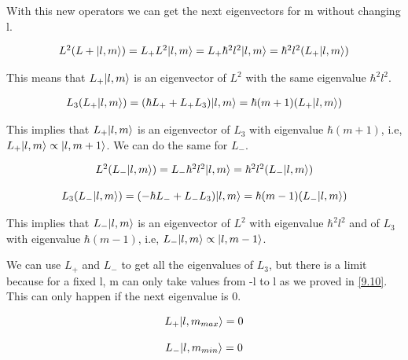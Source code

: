 With this new operators we can get the next eigenvectors for m without changing l.

\begin{equation}
  \begin{array}{c}
    L^2 (L+\lvert l,m\rangle) = L_+ L^2 \lvert l,m\rangle = L_+ \hbar^2 l^2 \lvert l,m\rangle = \hbar^2 l^2 (L_+ \lvert l,m\rangle)
  \end{array}
\end{equation}

This means that $L_+\lvert l,m\rangle$ is an eigenvector of $L^2$ with the same eigenvalue $\hbar^2 l^2$.

\begin{equation}
  \begin{array}{c}
  L_3(L_+\lvert l,m\rangle) = (\hbar L_+ + L_+ L_3)\lvert l,m\rangle = \hbar(m+1)(L_+\lvert l,m\rangle)
  \end{array}
\end{equation}

This implies that $L_+\lvert l,m\rangle$ is an eigenvector of $L_3$ with eigenvalue $\hbar(m+1)$, i.e, $L_+\lvert l,m\rangle \propto \lvert l,m+1\rangle$. We can do the same for $L_-$.

\begin{equation}
  \begin{array}{c}
    L^2(L_-\lvert l,m\rangle) = L_-\hbar^2 l^2 \lvert l,m\rangle = \hbar^2 l^2 (L_-\lvert l,m\rangle)
    \\

    \\
    L_3(L_-\lvert l,m\rangle) = (-\hbar L_- + L_- L_3)\lvert l,m\rangle = \hbar(m-1)(L_-\lvert l,m\rangle)
  \end{array}
\end{equation}

This implies that $L_-\lvert l,m\rangle$ is an eigenvector of $L^2$ with eigenvalue $\hbar^2 l^2$ and of $L_3$ with eigenvalue $\hbar(m-1)$, i.e, $L_-\lvert l,m\rangle \propto \lvert l,m-1\rangle$.

We can use $L_+$ and $L_-$ to get all the eigenvalues of $L_3$, but there is a limit because for a fixed l, m can only take values from -l to l as we proved in \ref{9.10}. This can only happen if the next eigenvalue is 0.

\begin{equation}
  \begin{array}{c}
    L_+\lvert l,m_{max}\rangle = 0
    \\

    \\
    L_-\lvert l,m_{min}\rangle = 0
  \end{array}
\end{equation}

